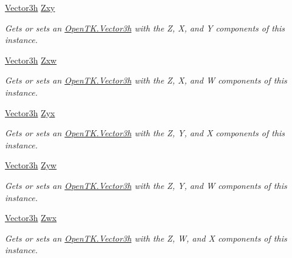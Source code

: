 \begin{DoxyCompactItemize}
\hyperlink{struct_open_t_k_1_1_vector3h}{Vector3h} \hyperlink{struct_open_t_k_1_1_vector4h_a755da32dba1d3799367e10a2f9295f36}{Zxy}
\begin{DoxyCompactList}\small\item\em Gets or sets an \hyperlink{struct_open_t_k_1_1_vector3h}{Open\-T\-K.\-Vector3h} with the Z, X, and Y components of this instance. \end{DoxyCompactList}\item 
\hyperlink{struct_open_t_k_1_1_vector3h}{Vector3h} \hyperlink{struct_open_t_k_1_1_vector4h_a6b295839c01dd1dbecc7bc966bc91a21}{Zxw}
\begin{DoxyCompactList}\small\item\em Gets or sets an \hyperlink{struct_open_t_k_1_1_vector3h}{Open\-T\-K.\-Vector3h} with the Z, X, and W components of this instance. \end{DoxyCompactList}\item 
\hyperlink{struct_open_t_k_1_1_vector3h}{Vector3h} \hyperlink{struct_open_t_k_1_1_vector4h_a7f554929725ef749433a3f9034ad6c9e}{Zyx}
\begin{DoxyCompactList}\small\item\em Gets or sets an \hyperlink{struct_open_t_k_1_1_vector3h}{Open\-T\-K.\-Vector3h} with the Z, Y, and X components of this instance. \end{DoxyCompactList}\item 
\hyperlink{struct_open_t_k_1_1_vector3h}{Vector3h} \hyperlink{struct_open_t_k_1_1_vector4h_acead85b3a431b669721d2cac51f8dba1}{Zyw}
\begin{DoxyCompactList}\small\item\em Gets or sets an \hyperlink{struct_open_t_k_1_1_vector3h}{Open\-T\-K.\-Vector3h} with the Z, Y, and W components of this instance. \end{DoxyCompactList}\item 
\hyperlink{struct_open_t_k_1_1_vector3h}{Vector3h} \hyperlink{struct_open_t_k_1_1_vector4h_aa144fa39ac5d4c276f8e50dd7fb32a33}{Zwx}
\begin{DoxyCompactList}\small\item\em Gets or sets an \hyperlink{struct_open_t_k_1_1_vector3h}{Open\-T\-K.\-Vector3h} with the Z, W, and X components of this instance. \end{DoxyCompactList}\item 

\end{DoxyCompactItemize}
